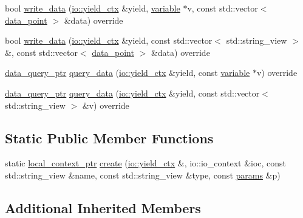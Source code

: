 \begin{DoxyCompactItemize}
\item 
bool \hyperlink{classtelegraph_1_1container_aad8390913b2961a2270e6d4065deb59b}{write\+\_\+data} (\hyperlink{structboost_1_1asio_1_1yield__ctx}{io\+::yield\+\_\+ctx} \&yield, \hyperlink{classtelegraph_1_1variable}{variable} $\ast$v, const std\+::vector$<$ \hyperlink{classtelegraph_1_1data__point}{data\+\_\+point} $>$ \&data) override
\item 
bool \hyperlink{classtelegraph_1_1container_a6c608535adf0fee7783f6684ab4b69c8}{write\+\_\+data} (\hyperlink{structboost_1_1asio_1_1yield__ctx}{io\+::yield\+\_\+ctx} \&yield, const std\+::vector$<$ std\+::string\+\_\+view $>$ \&, const std\+::vector$<$ \hyperlink{classtelegraph_1_1data__point}{data\+\_\+point} $>$ \&data) override
\item 
\hyperlink{namespacetelegraph_a6ffe775ac48dca2a4013b53d692199c8}{data\+\_\+query\+\_\+ptr} \hyperlink{classtelegraph_1_1container_a1a9849e53091061da81e7c1a73502e47}{query\+\_\+data} (\hyperlink{structboost_1_1asio_1_1yield__ctx}{io\+::yield\+\_\+ctx} \&yield, const \hyperlink{classtelegraph_1_1variable}{variable} $\ast$v) override
\item 
\hyperlink{namespacetelegraph_a6ffe775ac48dca2a4013b53d692199c8}{data\+\_\+query\+\_\+ptr} \hyperlink{classtelegraph_1_1container_aca8b0b22be3cde48f0bc5f3fa79b29da}{query\+\_\+data} (\hyperlink{structboost_1_1asio_1_1yield__ctx}{io\+::yield\+\_\+ctx} \&yield, const std\+::vector$<$ std\+::string\+\_\+view $>$ \&v) override
\end{DoxyCompactItemize}
\subsection*{Static Public Member Functions}
\begin{DoxyCompactItemize}
\item 
static \hyperlink{namespacetelegraph_ab59c7b38d99a98b4acc22433c920b1e6}{local\+\_\+context\+\_\+ptr} \hyperlink{classtelegraph_1_1container_a65eb3e80f805cbdb1c9335df40ff64ac}{create} (\hyperlink{structboost_1_1asio_1_1yield__ctx}{io\+::yield\+\_\+ctx} \&, io\+::io\+\_\+context \&ioc, const std\+::string\+\_\+view \&name, const std\+::string\+\_\+view \&type, const \hyperlink{classtelegraph_1_1params}{params} \&p)
\end{DoxyCompactItemize}
\subsection*{Additional Inherited Members}


